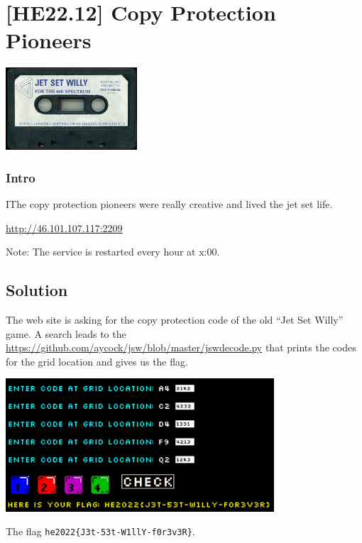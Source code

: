 
\hypertarget{he22.12}{%
\chapter{[HE22.12] Copy Protection Pioneers}\label{he22.12}}

\begin{marginfigure}
	\includegraphics[width=49mm]{level4/challenge12.jpg}
\end{marginfigure}
\subsection{Intro}
IThe copy protection pioneers were really creative and lived the jet set life.

\url{http://46.101.107.117:2209}

Note: The service is restarted every hour at x:00.


\section{Solution}\label{hv22.12solution}

The web site is asking for the copy protection code of the old ``Jet Set
Willy'' game.  A search leads to the 
\url{https://github.com/aycock/jsw/blob/master/jswdecode.py} that prints the
codes for the grid location and gives us the flag.

\includegraphics[width=100mm]{level4/solution12.png}

The flag \verb+he2022{J3t-53t-W1llY-f0r3v3R}+.




